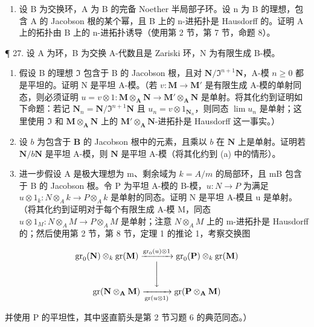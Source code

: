 \begin{enumerate}
\def\labelenumi{\arabic{enumi}.}
\setcounter{enumi}{25}
\tightlist
\item
  设 B 为交换环，A 为 B 的完备 Noether 半局部子环。设 n 为 B 的理想，包含 A 的 Jacobson 根的某个幂，且 B 上的 n-进拓扑是 Hausdorff 的。证明 A 上的拓扑由 B 上的 n-进拓扑诱导（使用第 2 节，第 7 节，命题 8）。
\end{enumerate}

¶ 27. 设 A 为环，B 为交换 A-代数且是 Zariski 环，N 为有限生成 B-模。

\begin{enumerate}
\def\labelenumi{(\alph{enumi})}
\item
  假设 B 的理想 \(\mathfrak{I}\) 包含于 B 的 Jacobson 根，且对 \(\mathbf{N} / \mathfrak{I}^{n + 1}\mathbf{N}\)，A-模 \(n\geqslant 0\) 都是平坦的。证明 N 是平坦 A-模。（若 \(v\colon \mathbf{M}\to \mathbf{M}'\) 是有限生成 A-模的单射同态，则必须证明 \(u = v\otimes 1:\mathbf{M}\otimes_{\mathbf{A}}\mathbf{N}\rightarrow \mathbf{M}'\otimes_{\mathbf{A}}\mathbf{N}\) 是单射。将其化约到证明如下命题：若记 \(\mathbf{N}_n = \mathbf{N} / \mathfrak{I}^{n + 1}\mathbf{N}\) 且 \(u_{n} = v\otimes 1_{\mathbf{N}_{n}}\)，则同态 \(\lim u_n\) 是单射；这里使用 \(\mathfrak{I}\) 和 \(\mathbf{M}\otimes_{\mathbf{A}}\mathbf{N}\) 上的 \(\mathbf{M}'\otimes_{\mathbf{A}}\mathbf{N}\)-进拓扑是 Hausdorff 这一事实。）
\item
   设 \(b\) 为包含于 \(\mathbf{B}\) 的 Jacobson 根中的元素，且乘以 \(b\) 在 \(\mathbf{N}\) 上是单射。证明若 \(\mathbf{N} / b\mathbf{N}\) 是平坦 A-模，则 \(\mathbf{N}\) 是平坦 A-模（将其化约到 (a) 中的情形）。
\item
  进一步假设 A 是极大理想为 m、剩余域为 \(k = A/m\) 的局部环，且 mB 包含于 B 的 Jacobson 根。令 P 为平坦 A-模的 B-模，\(u: N \to P\) 为满足 \(u \otimes 1_k: N \otimes_A k \to P \otimes_A k\) 是单射的同态。证明 N 是平坦 A-模且 u 是单射。（将其化约到证明对于每个有限生成 A-模 M，同态 \(u \otimes 1_M: N \otimes_A M \to P \otimes_A M\) 是单射；注意 \(N \otimes_A M\) 上的 m-进拓扑是 Hausdorff 的；然后使用第 2 节，第 8 节，定理 1 的推论 1，考察交换图
\end{enumerate}

\[
\begin{array}{c} \operatorname{gr} _ {0} (\mathbf {N}) \otimes_ {k} \operatorname{gr} (\mathbf {M}) \xrightarrow {\operatorname{gr} _ {0} (u) \otimes 1} \operatorname{gr} _ {0} (\mathbf {P}) \otimes_ {k} \operatorname{gr} (\mathbf {M}) \\ \Biggl \downarrow \\ \operatorname{gr} (\mathbf {N} \otimes_ {\mathbf {A}} \mathbf {M}) \xrightarrow [ \operatorname{gr} (u \otimes 1) ]{} \operatorname{gr} (\mathbf {P} \otimes_ {\mathbf {A}} \mathbf {M}) \end{array}
\]

并使用 P 的平坦性，其中竖直箭头是第 2 节习题 6 的典范同态。）

